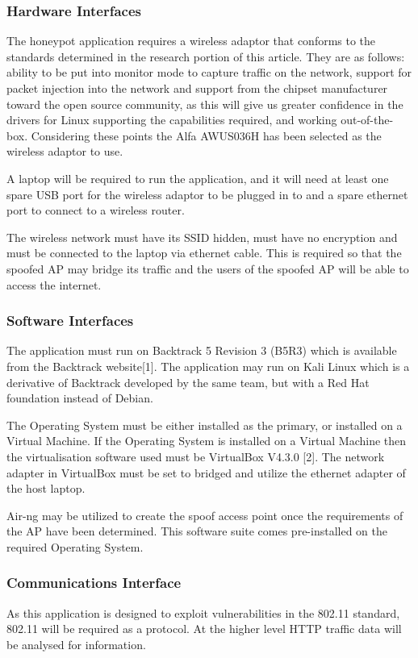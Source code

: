 \subsubsection{Hardware Interfaces}
The honeypot application requires a wireless adaptor that conforms to the standards determined in the research portion of this article. They are as follows: ability to be put into monitor mode to capture traffic on the network, support for packet injection into the network and support from the chipset manufacturer toward the open source community, as this will give us greater confidence in the drivers for Linux supporting the capabilities required, and working out-of-the-box. Considering these points the Alfa AWUS036H has been selected as the wireless adaptor to use.

A laptop will be required to run the application, and it will need at least one spare USB port for the wireless adaptor to be plugged in to and a spare ethernet port to connect to a wireless router.

The wireless network must have its SSID hidden, must have no encryption and must be connected to the laptop via ethernet cable. This is required so that the spoofed AP may bridge its traffic and the users of the spoofed AP will be able to access the internet.

\subsubsection{Software Interfaces}
The application must run on Backtrack 5 Revision 3 (B5R3) which is available from the Backtrack website[1]. The application may run on Kali Linux which is a derivative of Backtrack developed by the same team, but with a Red Hat foundation instead of Debian.

The Operating System must be either installed as the primary, or installed on a Virtual Machine. If the Operating System is installed on a Virtual Machine then the virtualisation software used must be VirtualBox V4.3.0 [2]. The network adapter in VirtualBox must be set to bridged and utilize the ethernet adapter of the host laptop.

Air-ng may be utilized to create the spoof access point once the requirements of the AP have been determined. This software suite comes pre-installed on the required Operating System. 

\subsubsection{Communications Interface}
As this application is designed to exploit vulnerabilities in the 802.11 standard, 802.11 will be required as a protocol. At the higher level HTTP traffic data will be analysed for information.

